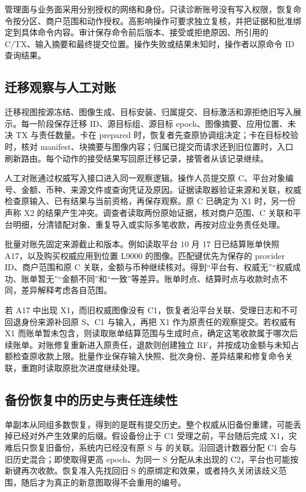 管理面与业务面采用分别授权的网络和身份。只读诊断账号没有写入权限，恢复命令按分区、商户范围和动作授权。高影响操作可要求独立复核，并把证据和批准绑定到具体命令内容。审计保存命令前后版本、接受或拒绝原因、所引用的 C/TX、输入摘要和最终提交位置。操作失败或结果未知时，操作者以原命令 ID 查询结果。

\subsection{迁移观察与人工对账}

迁移视图按源冻结、图像生成、目标安装、归属提交、目标激活和源拒绝旧写入展示。每一阶段保存迁移 ID、源目标组、源目标 epoch、图像摘要、应用位置、未决 TX 与责任数量。卡在 prepared 时，恢复者先查原协调组决定；卡在目标校验时，核对 manifest、块摘要与图像内容；归属已提交而请求还到旧位置时，入口刷新路由。每个动作的接受结果写回原迁移记录，接管者从该记录继续。

人工对账通过权威写入接口进入同一观察逻辑。操作人员提交原 C、平台对象编号、金额、币种、来源文件或查询凭证及原因。证据读取器验证来源和关联，权威检查原输入、已有结果与当前资格，再保存观察。原 C 已确定为 X1 时，另一份声称 X2 的结果产生冲突。调查者读取两份原始证据，核对商户范围、C 关联和平台明细，分清错配对象、重复导入或实际多笔收款，再按对应业务责任处理。


批量对账先固定来源截止和版本。例如读取平台 10 月 17 日已结算账单快照 A17，以及购买权威应用到位置 L9000 的图像。匹配键优先为保存的 provider ID、商户范围和原 C 关联，金额与币种继续核对。得到“平台有、权威无”“权威成功、账单暂无”“金额不同”和“一致”等差异。账单时点、结算时点与收款时点不同，差异解释考虑各自范围。

若 A17 中出现 X1，而旧权威图像没有 C1，恢复者沿平台关联、受理日志和不可回退身份来源补回原 S、C1 与输入，再把 X1 作为原责任的观察提交。若权威有 X1 而账单暂未包含，则读取账单结算范围与生成时点，确定这笔收款属于哪次后续账单。对账修复重新进入原责任，退款则创建独立 RF，并按成功金额与未知占额检查原收款上限。批量作业保存输入快照、批次身份、差异结果和修复命令关联，重跑时读取原批次进度继续处理。

\subsection{备份恢复中的历史与责任连续性}

单副本从同组多数恢复，得到的是既有提交历史。整个权威从旧备份重建，可能丢掉已经对外产生效果的后缀。假设备份止于 C1 受理之前，平台随后完成 X1，灾难后只恢复旧备份，系统内已经没有原 S 与  的关联。沿回退计数器分配 C1 会与旧历史混合；即使取得更高 epoch、为同一 S 分配从未出现的 C2，平台也可能按新键再次收款。恢复准入先找回旧 S 的原绑定和效果，或者持久关闭该歧义范围，随后才为真正的新意图取得不会重用的编号。

